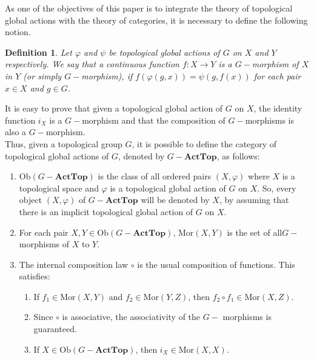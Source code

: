 \documentclass[sn-mathphys-num]{sn-jnl}%
\theoremstyle{thmstyleone}%
\theoremstyle{thmstyletwo}%
\theoremstyle{thmstylethree}%
\newtheorem{definition}{Definition}%
\begin{document}
As one of the objectives of this paper is to integrate the theory of topological global actions  with the theory of categories,  it is necessary to define the following notion.\\

\begin{definition}
Let $ \varphi $ and $ \psi $ be topological global  actions of $ G $ on $ X $ and $ Y $ respectively. We say that a continuous function $ f: X \to Y $ is a $ G-$morphism of $ X $ in $ Y $ (or simply $ G- $morphism), if  $ f (\varphi (g, x)) = \psi (g, f (x)) $ for each pair $ x \in X $ and $ g \in G $.\\
\end{definition}

It is easy to prove that given  a  topological global action  of $ G $ on $ X $,  the identity function $ i_{X} $ is a $G-$morphism  and that the composition of $G-$morphisms is also a $G-$morphism.\\

Thus, given a topological group $G$, it is possible to define the category of topological global actions of $G$, denoted by $G-\mathbf{ActTop}$, as follows:
\begin{enumerate}
\item $\text{Ob}(G-\mathbf{ActTop}) $ is the class of all ordered pairs $(X,\varphi)$ where $X$ is a topological space and $\varphi$ is a  topological global action of $G$ on  $X$.  So, every object $(X,\varphi)$ of   $G-\mathbf{ActTop}$ will be denoted by $X$, by assuming that there is an implicit topological global action of $G$ on $X$.
\item For each pair $ X, Y \in \text{Ob} (G-\mathbf{ActTop}) $, $ \text{Mor}(X, Y) $ is the set of all\linebreak $G-$morphisms of $ X $ to $ Y $.
\item The internal composition law $ \circ $ is the usual composition of functions. This satisfies:
  \begin{enumerate}
\item If $ f_1 \in \text{Mor} (X, Y) $ and $ f_2 \in \text{Mor} (Y, Z) $, then $ f_2 \circ f_1 \in \text {Mor} (X , Z) $.
\item Since $ \circ $ is associative, the associativity of the $ G- $ morphisms is guaranteed.
\item If $ X \in \text{Ob} (G-\mathbf{ActTop}) $, then $ i_{X} \in \text{Mor} (X, X) $.
  \end{enumerate}
  \end{enumerate}
\end{document}
